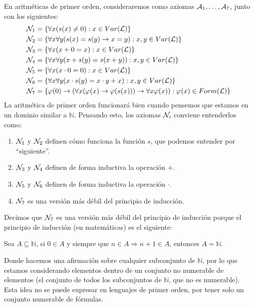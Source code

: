 En aritméticas de primer orden, consideraremos como axiomas $\mathcal{A}_1,\ldots,\mathcal{A}_7$, junto con los siguientes:
\begin{align*}
    \mathcal{N}_1 & = \{\forall x(s(x)\neq 0) : x\in Var(\mathcal{L})\} \\
    \mathcal{N}_2 &= \{\forall x\forall y(s(x) = s(y) \to x=y) : x,y\in Var(\mathcal{L})\} \\
    \mathcal{N}_3 &= \{\forall x(x+0=x):x\in Var(\mathcal{L})\} \\
    \mathcal{N}_4 &= \{\forall x\forall y(x+s(y) = s(x+y)) : x,y \in Var(\mathcal{L})\} \\
    \mathcal{N}_5 &= \{\forall x(x\cdot 0=0):x\in Var(\mathcal{L})\} \\
    \mathcal{N}_6 &= \{\forall x\forall y(x\cdot s(y) = x\cdot y+x) : x,y\in Var(\mathcal{L})\} \\
    \mathcal{N}_7 &= \{\varphi(0) \to (\forall x(\varphi(x)\to \varphi(s(x))) \to \forall x\varphi(x)) : \varphi(x) \in Form(\mathcal{L})\}
\end{align*}
La aritmética de primer orden funcionará bien cuando pensemos que estamos en un dominio similar a $\mathbb{N}$. Pensando esto, los axiomas $\mathcal{N}_i$ conviene entenderlos como:
\begin{enumerate}
    \item $\mathcal{N}_1$ y $\mathcal{N}_2$ definen cómo funciona la función $s$, que podemos entender por ``siguiente''.
    \item $\mathcal{N}_3$ y $\mathcal{N}_4$ definen de forma inductiva la operación $+$.
    \item $\mathcal{N}_5$ y $\mathcal{N}_6$ definen de forma inductiva la operación $\cdot $.
    \item $\mathcal{N}_7$ es una versión más débil del principio de inducción.
\end{enumerate}

Decimos que $\mathcal{N}_7$ es una versión más débil del principio de inducción porque el principio de inducción (en matemáticas) es el siguiente:
\begin{prop}
    Sea $A\subseteq \mathbb{N}$, si $0\in A$ y siempre que $n\in A\Longrightarrow n+1\in A$, entonces $A = \mathbb{N}$.
\end{prop}
Donde hacemos una afirmación sobre cualquier subconjunto de $\mathbb{N}$, por lo que estamos considerando elementos dentro de un conjunto no numerable de elementos (el conjunto de todos los subconjuntos de $\mathbb{N}$, que no es numerable). Esta idea no se puede expresar en lenguajes de primer orden, por tener solo un conjunto numerable de fórmulas.

